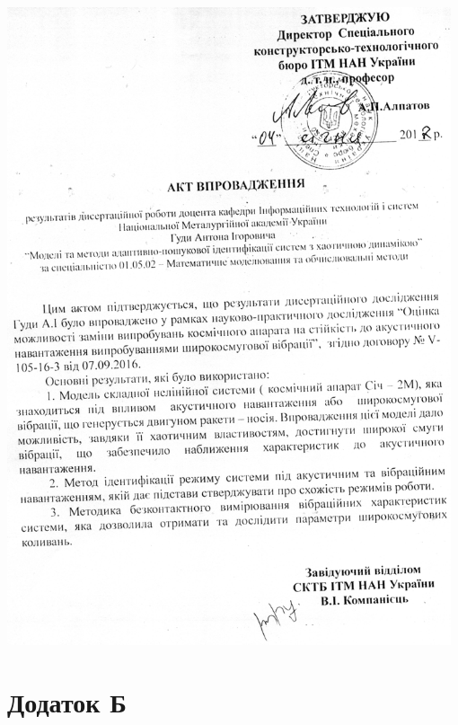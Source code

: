 \documentclass[13pt,d,ukrlang]{vakthesisatu}
\begin{document}
\vspace{-5ex}
\begin{center}
\includegraphics[width=0.98\textwidth]{sich2_akt.png}
\end{center}


\clearpage
{}
\vspace{-7ex}
\chapter*{Додаток Б}
\end{document}
